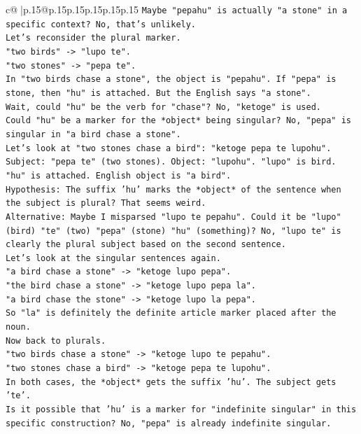 \documentclass{article}
\begin{document}
{\begin{supertabular}{c@{$\;$}|p{.15\linewidth}@{}p{.15\linewidth}p{.15\linewidth}p{.15\linewidth}p{.15\linewidth}p{.15\linewidth}}
{{{\texttt{Maybe "pepahu" is actually "a stone" in a specific context? No, that's unlikely.} \\
\texttt{Let's reconsider the plural marker.} \\
\texttt{"two birds" {-}> "lupo te".} \\
\texttt{"two stones" {-}> "pepa te".} \\
\texttt{In "two birds chase a stone", the object is "pepahu". If "pepa" is stone, then "hu" is attached. But the English says "a stone".} \\
\texttt{Wait, could "hu" be the verb for "chase"? No, "ketoge" is used.} \\
\texttt{Could "hu" be a marker for the *object* being singular? No, "pepa" is singular in "a bird chase a stone".} \\
\texttt{Let's look at "two stones chase a bird": "ketoge pepa te lupohu". Subject: "pepa te" (two stones). Object: "lupohu". "lupo" is bird. "hu" is attached. English object is "a bird".} \\
\texttt{Hypothesis: The suffix 'hu' marks the *object* of the sentence when the subject is plural? That seems weird.} \\
\texttt{Alternative: Maybe I misparsed "lupo te pepahu". Could it be "lupo" (bird) "te" (two) "pepa" (stone) "hu" (something)? No, "lupo te" is clearly the plural subject based on the second sentence.} \\
\texttt{Let's look at the singular sentences again.} \\
\texttt{"a bird chase a stone" {-}> "ketoge lupo pepa".} \\
\texttt{"the bird chase a stone" {-}> "ketoge lupo pepa la".} \\
\texttt{"a bird chase the stone" {-}> "ketoge lupo la pepa".} \\
\texttt{So "la" is definitely the definite article marker placed after the noun.} \\
\texttt{Now back to plurals.} \\
\texttt{"two birds chase a stone" {-}> "ketoge lupo te pepahu".} \\
\texttt{"two stones chase a bird" {-}> "ketoge pepa te lupohu".} \\
\texttt{In both cases, the *object* gets the suffix 'hu'. The subject gets 'te'.} \\
\texttt{Is it possible that 'hu' is a marker for "indefinite singular" in this specific construction? No, "pepa" is already indefinite singular.} \\
}}}
\end{supertabular}}
\end{document}
